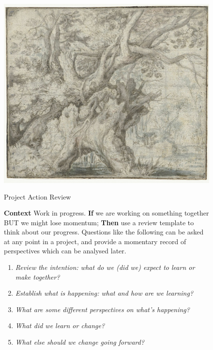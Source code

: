 \documentclass{article}
\begin{document}
\pagestyle{empty}
\thispagestyle{empty}
\pagecolor{gray!30}

\begin{figure}[h]
\begin{adjustbox}{minipage=[c]{\textwidth-10mm},margin= 5mm 5mm 5mm 10mm, frame=1pt, bgcolor=almond,env=center}%
\begin{center}
 \includegraphics[trim=5mm 8mm 5mm 8mm,clip,width=.5\paperwidth]{water_chart.jpg}
\end{center}

\begin{center}
\begin{minipage}[t]{0.7\paperwidth}

\medskip
{\huge Project Action Review}
\bigskip

\Large\raggedright
\textbf{Context} Work in progress.\newline
\textbf{If} we are working on something together
BUT we might lose momentum;\newline
\textbf{Then} use a review template to think about our progress.  Questions like the following can be asked at any point in a project, and provide a momentary record of perspectives which can be analysed later.

\medskip

\begin{enumerate}[noitemsep,topsep=0pt,parsep=0pt,partopsep=0pt]
\item \emph{Review the intention: what do we (did we) expect to learn or make together?}
\item \emph{Establish what is happening: what and how are we learning?}
\item \emph{What are some different perspectives on what’s happening?}
\item \emph{What did we learn or change?}
\item \emph{What else should we change going forward?}
\end{enumerate}


\end{minipage}
\end{center}
\end{adjustbox}
\end{figure}
\end{document}
